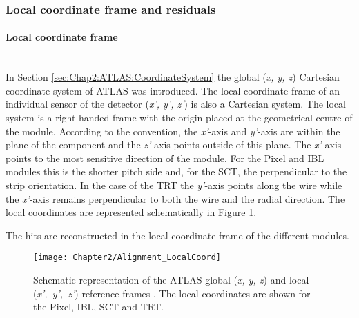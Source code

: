\subsubsection{Local coordinate frame and residuals}
\paragraph{Local coordinate frame}\mbox{}\\
In Section \ref{sec:Chap2:ATLAS:CoordinateSystem} the global (\textit{x, y, z}) Cartesian 
coordinate system of ATLAS was introduced. The local coordinate frame of an individual sensor
of the detector (\textit{x', y', z'}) is also a Cartesian system. The local system is a right-handed frame
with the origin placed at the geometrical centre of the module. According to the convention,
the \textit{x'}-axis and \textit{y'}-axis are within the plane of the component and the \textit{z'}-axis
points outside of this plane. The \textit{x'}-axis points to the most sensitive direction of the module. 
For the Pixel and IBL modules this is the shorter pitch side and, for the SCT, the perpendicular to the strip 
orientation. In the case of the TRT the \mbox{\textit{y'}-axis} points along the wire while the \textit{x'}-axis remains
perpendicular to both the wire and the radial direction. The local coordinates are represented schematically in 
Figure \ref{fig:Chap2:Alignment:LocalCoordinate}.

The hits are reconstructed in the local coordinate frame of the different
modules. %

\begin{figure}
\centering
\texttt{[image: Chapter2/Alignment\_LocalCoord]}
\caption{Schematic representation of the ATLAS global (\textit{x, y, z}) and local \mbox{(\textit{x', y', z'})} 
reference frames \cite{ATLAS:2020ixw}. The local coordinates are shown for the Pixel, IBL, SCT and TRT. }
\label{fig:Chap2:Alignment:LocalCoordinate}
\end{figure}

